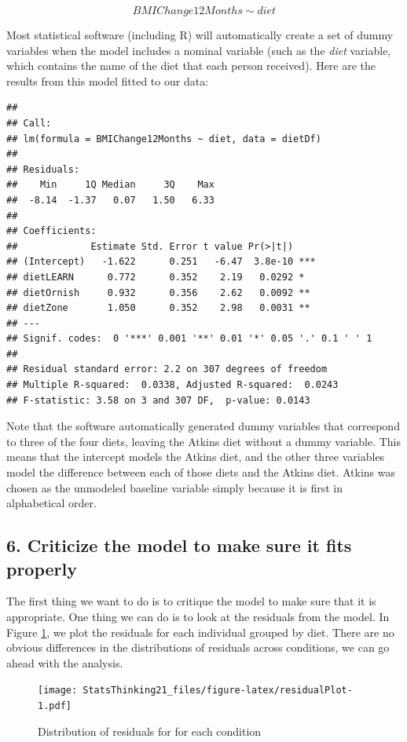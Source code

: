 \documentclass[12pt,]{book}
\theoremstyle{definition}
\theoremstyle{definition}
\theoremstyle{definition}
\theoremstyle{remark}
\begin{document}
\[
BMIChange12Months \sim diet
\]

Most statistical software (including R) will automatically create a set of dummy variables when the model includes a nominal variable (such as the \emph{diet} variable, which contains the name of the diet that each person received). Here are the results from this model fitted to our data:

\begin{verbatim}
## 
## Call:
## lm(formula = BMIChange12Months ~ diet, data = dietDf)
## 
## Residuals:
##    Min     1Q Median     3Q    Max 
##  -8.14  -1.37   0.07   1.50   6.33 
## 
## Coefficients:
##             Estimate Std. Error t value Pr(>|t|)    
## (Intercept)   -1.622      0.251   -6.47  3.8e-10 ***
## dietLEARN      0.772      0.352    2.19   0.0292 *  
## dietOrnish     0.932      0.356    2.62   0.0092 ** 
## dietZone       1.050      0.352    2.98   0.0031 ** 
## ---
## Signif. codes:  0 '***' 0.001 '**' 0.01 '*' 0.05 '.' 0.1 ' ' 1
## 
## Residual standard error: 2.2 on 307 degrees of freedom
## Multiple R-squared:  0.0338, Adjusted R-squared:  0.0243 
## F-statistic: 3.58 on 3 and 307 DF,  p-value: 0.0143
\end{verbatim}

Note that the software automatically generated dummy variables that correspond to three of the four diets, leaving the Atkins diet without a dummy variable. This means that the intercept models the Atkins diet, and the other three variables model the difference between each of those diets and the Atkins diet. Atkins was chosen as the unmodeled baseline variable simply because it is first in alphabetical order.

\hypertarget{criticize-the-model-to-make-sure-it-fits-properly}{%
\subsection{6. Criticize the model to make sure it fits properly}\label{criticize-the-model-to-make-sure-it-fits-properly}}

The first thing we want to do is to critique the model to make sure that it is appropriate. One thing we can do is to look at the residuals from the model. In Figure \ref{fig:residualPlot}, we plot the residuals for each individual grouped by diet. There are no obvious differences in the distributions of residuals across conditions, we can go ahead with the analysis.

\begin{figure}
\centering
\texttt{[image: StatsThinking21\_files/figure-latex/residualPlot-1.pdf]}
\caption{\label{fig:residualPlot}Distribution of residuals for for each condition}
\end{figure}
\end{document}
